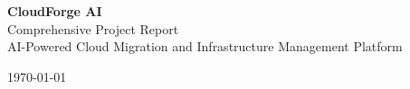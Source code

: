 \documentclass[12pt,a4paper]{report}
\begin{document}
\begin{titlepage}
    \centering
    \vspace*{1cm}
    
    {\LARGE\bfseries CloudForge AI}\\[0.5cm]
    {\Large Comprehensive Project Report}\\[0.5cm]
    {\large AI-Powered Cloud Migration and Infrastructure Management Platform}\\[2cm]
    
    \vfill
    
    {\large \today}
\end{titlepage}

\tableofcontents
\newpage


\end{document}
